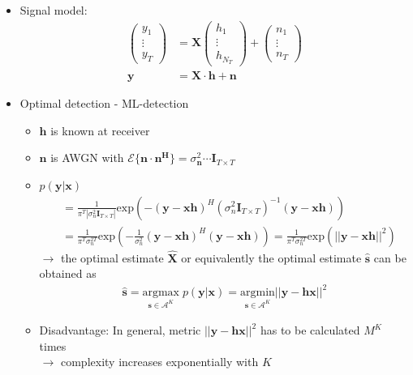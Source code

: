 \documentclass[a4paper, 10pt]{article}
\begin{document}
\begin{itemize}
	\item Signal model:
	\begin{align*}
	\begin{pmatrix} y_1 \\ \vdots \\ y_T \end{pmatrix}&=\mathbf{X}\begin{pmatrix} h_1 \\ \vdots \\ h_{N_T} \end{pmatrix} + \begin{pmatrix} n_1 \\ \vdots \\ n_T \end{pmatrix}\\
	\mathbf{y}&=\mathbf{X}\cdot\mathbf{h}+\mathbf{n}
	\end{align*}
	\item Optimal detection - ML-detection
	\begin{itemize}
		\item $\mathbf{h}$ is known at receiver
		\item $\mathbf{n}$ is AWGN with $\mathcal{E}\{\mathbf{n}\cdot\mathbf{n^H}\}=\sigma_{\mathbf{n}}^2\cdots \mathbf{I}_{T\times T}$
		\item $p(\mathbf{y}|\mathbf{x})$
		\begin{align*}
		&=\frac{1}{\pi^T|\sigma_n^2\mathbf{I}_{T\times T}|}\mathrm{exp}\left(-(\mathbf{y - xh})^H(\sigma_n^2\mathbf{I}_{T\times T})^{-1}(\mathbf{y-xh})\right)\\
		&=\frac{1}{\pi^T\sigma_n^{2T}}\mathrm{exp}\left(-\frac{1}{\sigma_n^2}(\mathbf{y-xh})^H(\mathbf{y-xh})\right)=\frac{1}{\pi^T\sigma_n^{2T}}\mathrm{exp}\left(||\mathbf{y-xh}||^2\right)
		\end{align*}
		$\rightarrow$ the optimal estimate $\hat{\mathbf{X}}$ or equivalently the optimal estimate $\hat{\mathbf{s}}$ can be obtained as
		\begin{align*}
			\hat{\mathbf{s}}=\underset{\mathbf{s}\in\mathcal{A}^K}{\mathrm{argmax}}\;p(\mathbf{y|x})=\underset{\mathbf{s}\in\mathcal{A}^K}{\mathrm{argmin}}||\mathbf{y-hx}||^2
		\end{align*}
		\item Disadvantage: In general, metric $||\mathbf{y-hx}||^2$ has to be calculated $M^K$ times\\
		$\rightarrow$ complexity increases exponentially with $K$
	\end{itemize}
\end{itemize}
\end{document}
